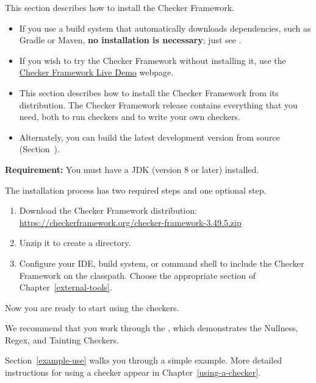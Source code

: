 This section describes how to install the Checker Framework.
\begin{itemize}
\item
If you use a build system that automatically downloads dependencies,
such as Gradle or Maven, \textbf{no installation is necessary}; just see
.
\item
If you wish to try the Checker Framework without installing it, use the
\href{http://eisop.uwaterloo.ca/live/}{Checker Framework Live Demo} webpage.
\item
This section describes how to install the Checker Framework from its
distribution.  The Checker Framework release contains everything that you
need, both to run checkers and to write your own checkers.
\item
Alternately, you can build the latest development version from source
(Section~).
\end{itemize}


\textbf{Requirement:}
You must have a JDK (version 8 or later) installed.

The installation process has two required steps and one
optional step.
\begin{enumerate}
\item
  Download the Checker Framework distribution:
  \\
  \url{https://checkerframework.org/checker-framework-3.49.5.zip}

\item
  Unzip it to create a  directory.

\item
  \label{installation-configure-step}%
  Configure your IDE, build system, or command shell to include the Checker
  Framework on the classpath.  Choose the appropriate section of
  Chapter~\ref{external-tools}.


\end{enumerate}

Now you are ready to start using the checkers.

We recommend that you work through the
, which demonstrates the Nullness, Regex, and Tainting Checkers.

Section~\ref{example-use} walks you through a simple example.  More detailed
instructions for using a checker appear in Chapter~\ref{using-a-checker}.

